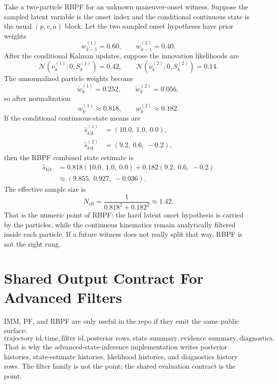 \documentclass[11pt]{article}
\begin{document}
Take a two-particle RBPF for an unknown maneuver-onset witness. Suppose the
sampled latent variable is the onset index and the conditional continuous state
is the usual \((p, v, a)\) block. Let the two sampled onset hypotheses have
prior weights
\begin{equation}
    w_{k-1}^{(1)} = 0.60,\qquad
    w_{k-1}^{(2)} = 0.40.
\end{equation}
After the conditional Kalman updates, suppose the innovation likelihoods are
\begin{equation}
    \mathcal{N}(\nu_k^{(1)};0,S_k^{(1)}) = 0.42,\qquad
    \mathcal{N}(\nu_k^{(2)};0,S_k^{(2)}) = 0.14.
\end{equation}
The unnormalized particle weights become
\begin{equation}
    \tilde{w}_k^{(1)} = 0.252,\qquad
    \tilde{w}_k^{(2)} = 0.056,
\end{equation}
so after normalization
\begin{equation}
    w_k^{(1)} \approx 0.818,\qquad
    w_k^{(2)} \approx 0.182.
\end{equation}
If the conditional continuous-state means are
\begin{align}
    \hat{s}_{k|k}^{(1)} &= (10.0,\ 1.0,\ 0.0), \\
    \hat{s}_{k|k}^{(2)} &= (9.2,\ 0.6,\ -0.2),
\end{align}
then the RBPF combined state estimate is
\begin{align}
    \hat{s}_{k|k}
    &=
    0.818(10.0,\ 1.0,\ 0.0)
    +
    0.182(9.2,\ 0.6,\ -0.2)
    \\
    &\approx
    (9.855,\ 0.927,\ -0.036).
\end{align}
The effective sample size is
\begin{equation}
    N_{\text{eff}}
    =
    \frac{1}{0.818^2 + 0.182^2}
    \approx 1.42.
\end{equation}
That is the numeric point of RBPF: the hard latent onset hypothesis is carried
by the particles, while the continuous kinematics remain analytically filtered
inside each particle. If a future witness does not really split that way, RBPF
is not the right rung.

\section{Shared Output Contract For Advanced Filters}

IMM, PF, and RBPF are only useful in the repo if they emit the same public
surface:
\begin{equation}
    \text{trajectory id},
    \text{time},
    \text{filter id},
    \text{posterior rows},
    \text{state summary},
    \text{evidence summary},
    \text{diagnostics}.
\end{equation}
That is why the advanced-state-inference implementation writes posterior
histories, state-estimate histories, likelihood histories, and diagnostics
history rows. The filter family is not the point; the shared evaluation contract
is the point.
\end{document}
